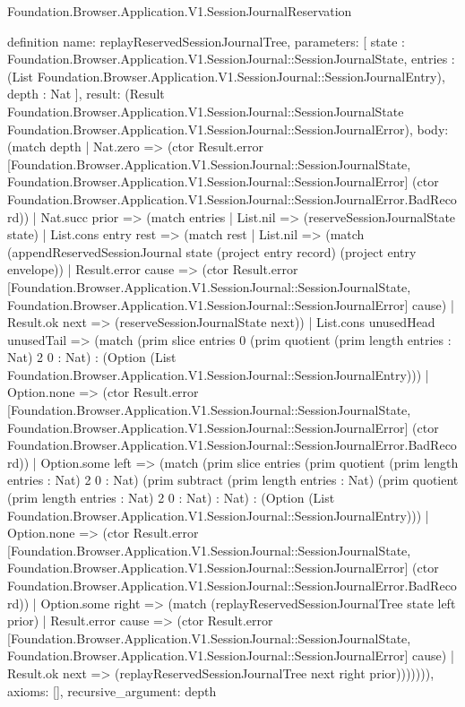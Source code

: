 \begin{lexlean}{Foundation.Browser.Application.V1.SessionJournalReservation}
\begin{semanticmodule}
definition{
  name: replayReservedSessionJournalTree,
  parameters: [
    state : Foundation.Browser.Application.V1.SessionJournal::SessionJournalState,
    entries : (List Foundation.Browser.Application.V1.SessionJournal::SessionJournalEntry),
    depth : Nat
  ],
  result: (Result Foundation.Browser.Application.V1.SessionJournal::SessionJournalState Foundation.Browser.Application.V1.SessionJournal::SessionJournalError),
  body: (match depth
    | Nat.zero => (ctor Result.error [Foundation.Browser.Application.V1.SessionJournal::SessionJournalState, Foundation.Browser.Application.V1.SessionJournal::SessionJournalError] (ctor Foundation.Browser.Application.V1.SessionJournal::SessionJournalError.BadRecord))
    | Nat.succ prior => (match entries
      | List.nil => (reserveSessionJournalState state)
      | List.cons entry rest => (match rest
        | List.nil => (match (appendReservedSessionJournal state (project entry record) (project entry envelope))
          | Result.error cause => (ctor Result.error [Foundation.Browser.Application.V1.SessionJournal::SessionJournalState, Foundation.Browser.Application.V1.SessionJournal::SessionJournalError] cause)
          | Result.ok next => (reserveSessionJournalState next))
        | List.cons unusedHead unusedTail => (match (prim slice entries 0 (prim quotient (prim length entries : Nat) 2 0 : Nat) : (Option (List Foundation.Browser.Application.V1.SessionJournal::SessionJournalEntry)))
          | Option.none => (ctor Result.error [Foundation.Browser.Application.V1.SessionJournal::SessionJournalState, Foundation.Browser.Application.V1.SessionJournal::SessionJournalError] (ctor Foundation.Browser.Application.V1.SessionJournal::SessionJournalError.BadRecord))
          | Option.some left => (match (prim slice entries (prim quotient (prim length entries : Nat) 2 0 : Nat) (prim subtract (prim length entries : Nat) (prim quotient (prim length entries : Nat) 2 0 : Nat) : Nat) : (Option (List Foundation.Browser.Application.V1.SessionJournal::SessionJournalEntry)))
            | Option.none => (ctor Result.error [Foundation.Browser.Application.V1.SessionJournal::SessionJournalState, Foundation.Browser.Application.V1.SessionJournal::SessionJournalError] (ctor Foundation.Browser.Application.V1.SessionJournal::SessionJournalError.BadRecord))
            | Option.some right => (match (replayReservedSessionJournalTree state left prior)
              | Result.error cause => (ctor Result.error [Foundation.Browser.Application.V1.SessionJournal::SessionJournalState, Foundation.Browser.Application.V1.SessionJournal::SessionJournalError] cause)
              | Result.ok next => (replayReservedSessionJournalTree next right prior))))))),
  axioms: [],
  recursive_argument: depth
}


\end{semanticmodule}
\end{lexlean}
